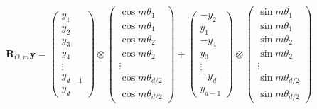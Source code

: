 \documentclass[11pt,addpoints,answers]{exam}
\newcommand{\yv}{\mathbf{y}}
\newcommand{\Rv}{\mathbf{R}}
\begin{document}
\begin{questions}
    \begin{align*}
        \Rv_{\Theta,m} \yv = 
        \left( \begin{array}{c} 
        y_1 \\ y_2 \\ y_3 \\ y_4 \\ \vdots \\ y_{d-1} \\ y_d 
        \end{array} \right)
        \otimes
        \left( \begin{array}{c}
        \cos m\theta_1 \\ \cos m\theta_1 \\ \cos m\theta_2 \\ \cos m\theta_2 \\ \vdots \\ 
        \cos m\theta_{d/2} \\ \cos m\theta_{d/2} 
        \end{array} \right)
        +
        \left( \begin{array}{c}
        -y_2 \\ y_1 \\ -y_4 \\ y_3 \\ \vdots \\ -y_d \\ y_{d-1} 
        \end{array} \right)
        \otimes
        \left( \begin{array}{c}
        \sin m\theta_1 \\ \sin m\theta_1 \\ \sin m\theta_2 \\ \sin m\theta_2 \\ \vdots \\
        \sin m\theta_{d/2} \\ \sin m\theta_{d/2} 
        \end{array} \right)
    \end{align*}


\end{questions}
\end{document}
